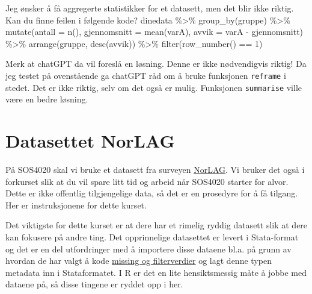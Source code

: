 \documentclass[
  letterpaper,
  DIV=11,
  numbers=noendperiod]{scrreprt}
\newenvironment{Shaded}{\begin{snugshade}}{\end{snugshade}}
\newcommand{\AttributeTok}[1]{\textcolor[rgb]{0.40,0.45,0.13}{#1}}
\newcommand{\ControlFlowTok}[1]{\textcolor[rgb]{0.00,0.23,0.31}{#1}}
\newcommand{\DecValTok}[1]{\textcolor[rgb]{0.68,0.00,0.00}{#1}}
\newcommand{\FunctionTok}[1]{\textcolor[rgb]{0.28,0.35,0.67}{#1}}
\newcommand{\NormalTok}[1]{\textcolor[rgb]{0.00,0.23,0.31}{#1}}
\newcommand{\SpecialCharTok}[1]{\textcolor[rgb]{0.37,0.37,0.37}{#1}}
\theoremstyle{definition}
\theoremstyle{remark}
\begin{document}
\begin{Shaded}
\begin{Highlighting}[]
\NormalTok{Jeg ønsker å få aggregerte statistikker }\ControlFlowTok{for}\NormalTok{ et datasett, men det blir ikke riktig. Kan du finne feilen i følgende kode? }
\NormalTok{  dinedata }\SpecialCharTok{\%\textgreater{}\%} 
  \FunctionTok{group\_by}\NormalTok{(gruppe) }\SpecialCharTok{\%\textgreater{}\%} 
  \FunctionTok{mutate}\NormalTok{(}\AttributeTok{antall =} \FunctionTok{n}\NormalTok{(), }\AttributeTok{gjennomsnitt =} \FunctionTok{mean}\NormalTok{(varA), }
         \AttributeTok{avvik =}\NormalTok{ varA }\SpecialCharTok{{-}}\NormalTok{ gjennomsnitt) }\SpecialCharTok{\%\textgreater{}\%} 
  \FunctionTok{arrange}\NormalTok{(gruppe, }\FunctionTok{desc}\NormalTok{(avvik)) }\SpecialCharTok{\%\textgreater{}\%} 
  \FunctionTok{filter}\NormalTok{(}\FunctionTok{row\_number}\NormalTok{() }\SpecialCharTok{==} \DecValTok{1}\NormalTok{)}
\end{Highlighting}
\end{Shaded}

Merk at chatGPT da vil foreslå en løsning. Denne er ikke nødvendigvis
riktig! Da jeg testet på ovenstående ga chatGPT råd om å bruke
funksjonen \texttt{reframe} i stedet. Det er ikke riktig, selv om det
også er mulig. Funksjonen \texttt{summarise} ville være en bedre
løsning.

\hypertarget{datasettet-norlag}{%
\chapter{Datasettet NorLAG}\label{datasettet-norlag}}

På SOS4020 skal vi bruke et datasett fra surveyen
\href{https://norlag.nsd.no/}{NorLAG}. Vi bruker det også i forkurset
slik at du vil spare litt tid og arbeid når SOS4020 starter for alvor.
Dette er ikke offentlig tilgjengelige data, så det er en prosedyre for å
få tilgang. Her er instruksjonene for dette kurset.

Det viktigste for dette kurset er at dere har et rimelig ryddig datasett
slik at dere kan fokusere på andre ting. Det opprinnelige datasettet er
levert i Stata-format og det er en del utfordringer med å importere
disse dataene bl.a. på grunn av hvordan de har valgt å kode
\href{https://norlag.nsd.no/filterverdier}{missing og filterverdier} og
lagt denne typen metadata inn i Stataformatet. I R er det en lite
hensiktsmessig måte å jobbe med dataene på, så disse tingene er ryddet
opp i her.
\end{document}
